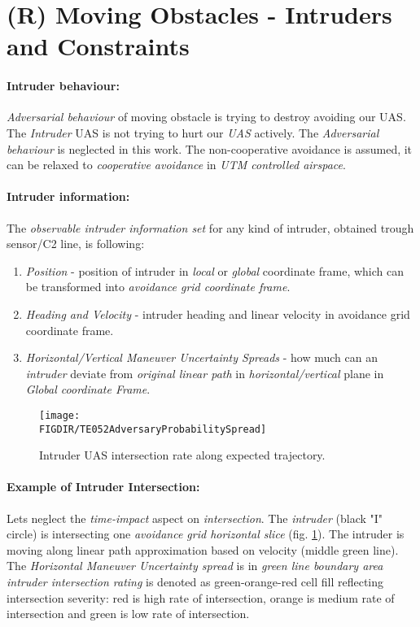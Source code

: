 \newpage
\section{(R) Moving Obstacles - Intruders and Constraints}\label{s:intruders}
\paragraph{Intruder behaviour:} \emph{Adversarial behaviour} of moving obstacle is trying to destroy avoiding our UAS.  The \emph{Intruder} UAS \cite{fiorini1998motion} is not trying to hurt our \emph{UAS} actively. The \emph{Adversarial behaviour} is neglected in this work. The non-cooperative avoidance is assumed, it can be relaxed to \emph{cooperative avoidance} in \emph{UTM controlled airspace}.

\paragraph{Intruder information:} The \emph{observable intruder information set} for any kind of intruder, obtained trough sensor/C2 line, is following:
\begin{enumerate}
    \item\emph{Position} - position of intruder in \emph{local} or \emph{global} coordinate frame, which can be transformed into \emph{avoidance grid coordinate frame}.
    
    \item\emph{Heading and Velocity} - intruder heading and linear velocity in avoidance grid coordinate frame.
    
    \item\emph{Horizontal/Vertical Maneuver Uncertainty Spreads} - how much can an \emph{intruder} deviate from \emph{original linear path} in \emph{horizontal/vertical} plane in \emph{Global coordinate Frame}.
\end{enumerate}

 

\begin{figure}[H]
    \centering
    \texttt{[image: \\FIGDIR/TE052AdversaryProbabilitySpread]}
    \caption{Intruder UAS intersection rate along expected trajectory.}
    \label{fig:intruderProbabiltySpreadTheoretical}
\end{figure}   

\paragraph{Example of Intruder Intersection:} Lets neglect the \emph{time-impact} aspect on \emph{intersection}.  The \emph{intruder} (black "I" circle) is intersecting one \emph{avoidance grid horizontal slice} (fig. \ref{fig:intruderProbabiltySpreadTheoretical}).  The intruder is moving along linear path approximation based on velocity (middle green line). The \emph{Horizontal Maneuver Uncertainty spread} is in \emph{green line boundary area} \emph{intruder intersection rating} is denoted as green-orange-red cell fill reflecting intersection severity:  red is high rate of intersection, orange is medium rate of intersection and green is low rate of intersection.
    


